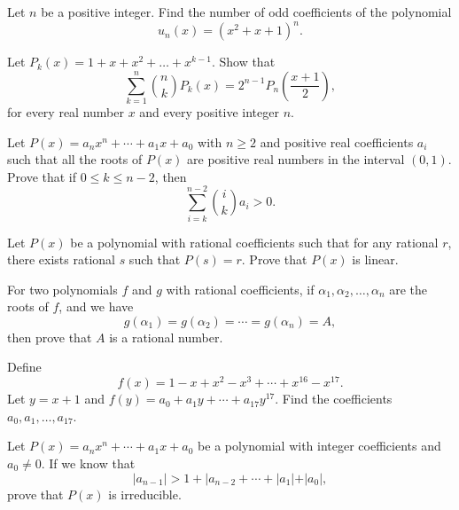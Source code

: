 \begin{question}[name={1988 IMO Longlist}]
Let $n$ be a positive integer. Find the number of odd coefficients of the polynomial \[ u_n(x) = (x^2 + x + 1)^n.\]
\end{question}

\begin{question}[name={1998 Baltic Way}]
    Let $P_k(x)=1+x+x^2+\ldots +x^{k-1}$. Show that
    \[ \sum_{k=1}^n \binom{n}{k} P_k(x)=2^{n-1} P_n \left( \frac{x+1}{2} \right), \]
    for every real number $x$ and every positive integer $n$.
\end{question}


\begin{question}[name={1998 Iran}]
    Let $P(x)=a_nx^n+\cdots+a_1x+a_0$ with $n\geq 2$ and positive real coefficients $a_i$ such that all the roots of $P(x)$ are positive real numbers in the interval $(0,1)$. Prove that if $0\leq k \leq n-2$, then
    \[\sum_{i=k}^{n-2} \binom{i}{k} a_i > 0.\]
\end{question}



\begin{question}[name={1998 Iran}]
    Let $P(x)$ be a polynomial with rational coefficients such that for any rational $r$, there exists rational $s$ such that $P(s)=r$. Prove that $P(x)$ is linear.
\end{question}



\begin{question}[name={1998 Iran}]
    For two polynomials $f$ and $g$ with rational coefficients, if $\alpha_1,\alpha_2,\dots,\alpha_n$ are the roots of $f$, and we have
    \[g(\alpha_1)=g(\alpha_2)=\cdots = g(\alpha_n) = A,\] then prove that $A$ is a rational number.
\end{question}




\begin{question}[name={1998 Iran}]
    Define \[f(x)=1-x+x^2-x^3+\cdots+x^{16}-x^{17}.\]
    Let $y=x+1$ and $f(y)=a_0+a_1y+\cdots+a_{17}y^{17}$. Find the coefficients $a_0,a_1,\dots,a_{17}$.
\end{question}



\begin{question}[name={1998 Iran}]
    Let $P(x)=a_nx^n+\cdots+a_1x+a_0$ be a polynomial with integer coefficients and $a_0\neq 0$. If we know that \[|a_{n-1}| > 1 + |a_{n-2} + \cdots + |a_1| + |a_0|,\] prove that $P(x)$ is irreducible.
\end{question}




